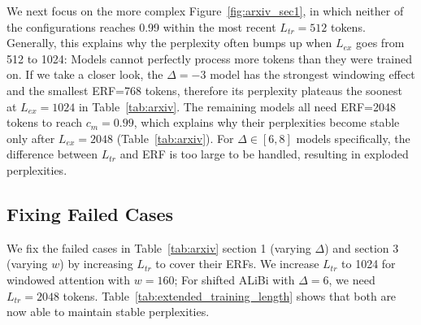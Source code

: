 \documentclass[11pt]{article}
\theoremstyle{plain}
\begin{document}
We next focus on the more complex Figure~\ref{fig:arxiv_sec1}, in which neither of the configurations reaches 0.99 within the most recent $L_{tr}=512$ tokens. Generally, this explains why the perplexity often bumps up when $L_{ex}$ goes from 512 to 1024: Models cannot perfectly process more tokens than they were trained on. If we take a closer look, the $\Delta=-3$ model has the strongest windowing effect and the smallest ERF=768 tokens, therefore its perplexity plateaus the soonest at $L_{ex}=1024$ in Table~\ref{tab:arxiv}. The remaining models all need ERF=2048 tokens to reach $c_m=0.99$, which explains why their perplexities become stable only after $L_{ex}=2048$ (Table~\ref{tab:arxiv}). For $\Delta\in[6,8]$ models specifically, the difference between $L_{tr}$ and ERF is too large to be handled, resulting in exploded perplexities.

\subsection{Fixing Failed Cases}
We fix the failed cases in Table~\ref{tab:arxiv} section 1 (varying $\Delta$) and section 3 (varying $w$) by increasing $L_{tr}$ to cover their ERFs. We increase $L_{tr}$ to 1024 for windowed attention with $w=160$; For shifted ALiBi with $\Delta=6$, we need $L_{tr}=2048$ tokens. Table~\ref{tab:extended_training_length} shows that both are now able to maintain stable perplexities.

\begin{table}[!htbp]
    \setlength{\tabcolsep}{2pt}
    \caption{Fixing failed cases with longer $L_{tr}$: $L_{tr}=2048$ for ALiBi with $\Delta=6$ and $L_{tr}=1024$ for windowed attention with $w=160$.}
    \label{tab:extended_training_length}
\end{table}
\end{document}
